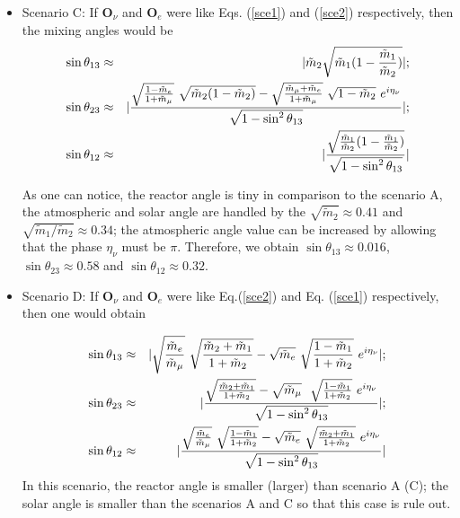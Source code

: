 \documentclass[aps,prd,groupaddress,floatfix,tighten,nofootinbib,showpacs,amsfonts,superscriptaddress]{revtex4-2}
\begin{document}
\begin{enumerate}
\begin{itemize}
	\item Scenario C: If $\mathbf{O}_{\nu}$ and $\mathbf{O}_{e}$ were like Eqs. (\ref{sce1}) and (\ref{sce2}) respectively, then the mixing angles would be
	\begin{eqnarray}
	\sin{\theta_{13}}&\approx& \lvert \tilde{m}_{2} \sqrt{\tilde{m}_{1}(1-\frac{\tilde{m}_{1}}{\tilde{m}_{2}})} \rvert;\notag\\
	\sin{\theta_{23}}&\approx&\lvert \frac{ \sqrt{\frac{1-\tilde{m}_{e}}{1+\tilde{m}_{\mu}}}
		~\sqrt{\tilde{m}_{2}(1-\tilde{m}_{2})}- \sqrt{\frac{\tilde{m}_{\mu}+\tilde{m}_{e}}{1+\tilde{m}_{\mu}}}
		~\sqrt{1-\tilde{m}_{2}}~ e^{i\eta_{\nu}}}{\sqrt{1-\sin^{2}{\theta_{13}}}}\rvert;\notag\\
	\sin{\theta_{12}}&\approx& \lvert \frac{ \sqrt{\frac{\tilde{m}_{1}}{\tilde{m}_{2}}(1-\frac{\tilde{m}_{1}}{\tilde{m}_{2}})}}{\sqrt{1-\sin^{2}{\theta_{13}}}}\rvert
	\end{eqnarray}
	
As one can notice, the reactor angle is tiny in comparison to the scenario A, the atmospheric and solar angle are handled by the 
$\sqrt{\tilde{m}_{2}}\approx 0.41$ and $\sqrt{\tilde{m}_{1}/\tilde{m}_{2}}\approx0.34$; the atmospheric angle value can be increased by allowing that the phase $\eta_{\nu}$ must be $\pi$. Therefore, we obtain $\sin{\theta_{13}}\approx0.016$, $\sin{\theta_{23}}\approx 0.58$ and $\sin{\theta_{12}}\approx 0.32$. 


\item Scenario D: If $\mathbf{O}_{\nu}$ and $\mathbf{O}_{e}$ were like Eq.(\ref{sce2}) and Eq. (\ref{sce1}) respectively, then one would obtain
	
	\begin{eqnarray}
	\sin{\theta_{13}}&\approx& \lvert \sqrt{\frac{\tilde{m}_{e}}{\tilde{m}_{\mu}}}~\sqrt{\frac{\tilde{m}_{2}+\tilde{m}_{1}}{1+\tilde{m}_{2}}}-\sqrt{\tilde{m}_{e}}~\sqrt{\frac{1-\tilde{m}_{1}}{1+\tilde{m}_{2}}}~e^{i\eta_{\nu}} \rvert;\notag\\
	\sin{\theta_{23}}&\approx&\lvert \frac{ \sqrt{\frac{\tilde{m}_{2}+\tilde{m}_{1}}{1+\tilde{m}_{2}}}-\sqrt{\tilde{m}_{\mu}}~
		~\sqrt{\frac{1-\tilde{m}_{1}}{1+\tilde{m}_{2}}}~ e^{i\eta_{\nu}}}{\sqrt{1-\sin^{2}{\theta_{13}}}}\rvert;\notag\\
	\sin{\theta_{12}}&\approx& \lvert \frac{ \sqrt{\frac{\tilde{m}_{e}}{\tilde{m}_{\mu}}}~ \sqrt{\frac{1-\tilde{m}_{1}}{1+\tilde{m}_{2}}}-\sqrt{\tilde{m}_{e}}
		~\sqrt{\frac{\tilde{m}_{2}+\tilde{m}_{1}}{1+\tilde{m}_{2}}}~ e^{i\eta_{\nu}}}{\sqrt{1-\sin^{2}{\theta_{13}}}}\rvert
	\end{eqnarray}
In this scenario, the reactor angle is smaller (larger) than scenario A (C); the solar angle is smaller than the scenarios A and C so that this case is rule out.	
\end{itemize}



\end{enumerate}
\end{document}
